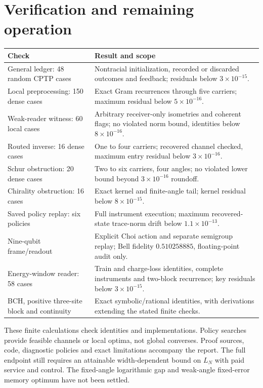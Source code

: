 \section{Verification and remaining operation}
\begin{center}
\begin{tabular}{>{\raggedright\arraybackslash}p{.43\linewidth}>{\raggedright\arraybackslash}p{.46\linewidth}}
\toprule
Check & Result and scope\\\midrule
General ledger: 48 random CPTP cases & Nontracial initialization, recorded or
discarded outcomes and feedback; residuals below $3\times10^{-15}$.\\
Local preprocessing: 150 dense cases & Exact Gram recurrences through five
carriers; maximum residual below $5\times10^{-16}$.\\
Weak-reader witness: 60 local cases & Arbitrary receiver-only isometries and
coherent flags; no violated norm bound, identities below $8\times10^{-16}$.\\
Routed inverse: 16 dense cases & One to four carriers; recovered channel
checked, maximum entry residual below $3\times10^{-16}$.\\
Schur obstruction: 20 dense cases & Two to six carriers, four angles;
no violated lower bound beyond $3\times10^{-16}$ roundoff.\\
Chirality obstruction: 16 cases & Exact kernel and finite-angle tail;
kernel residual below $8\times10^{-15}$.\\
Saved policy replay: six policies & Full instrument execution; maximum
recovered-state trace-norm drift below $1.1\times10^{-13}$.\\
Nine-qubit frame/readout & Explicit Choi action and separate semigroup
replay; Bell fidelity $0.510258885$, floating-point audit only.\\
Energy-window reader: 58 cases & Train and charge-loss identities, complete
instruments and two-block recurrence; key residuals below $3\times10^{-15}$.\\
BCH, positive three-site block and continuity & Exact symbolic/rational
identities, with derivations extending the stated finite checks.\\\bottomrule
\end{tabular}
\end{center}
These finite calculations check identities and implementations. Policy
searches provide feasible channels or local optima, not global converses.
Proof sources, code, diagnostic policies and exact limitations accompany
the report. The full endpoint still requires an attainable width-dependent
bound on $L_N$ with paid service and control. The fixed-angle logarithmic
gap and weak-angle fixed-error memory optimum have not been settled.
